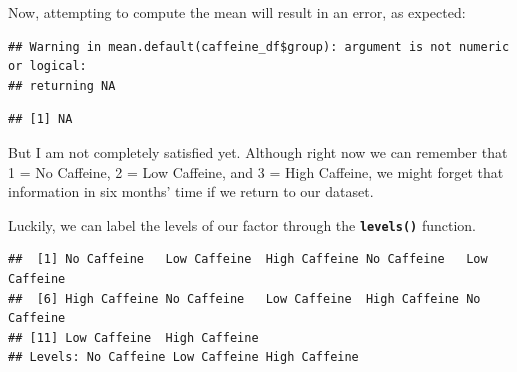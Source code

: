 \documentclass[
]{book}
\newenvironment{Shaded}{\begin{snugshade}}{\end{snugshade}}
\newcommand{\FunctionTok}[1]{\textcolor[rgb]{0.13,0.29,0.53}{\textbf{#1}}}
\newcommand{\NormalTok}[1]{#1}
\newcommand{\OtherTok}[1]{\textcolor[rgb]{0.56,0.35,0.01}{#1}}
\newcommand{\SpecialCharTok}[1]{\textcolor[rgb]{0.81,0.36,0.00}{\textbf{#1}}}
\newcommand{\StringTok}[1]{\textcolor[rgb]{0.31,0.60,0.02}{#1}}
\begin{document}
\begin{Shaded}
\end{Shaded}

Now, attempting to compute the mean will result in an error, as expected:

\begin{Shaded}
\end{Shaded}

\begin{verbatim}
## Warning in mean.default(caffeine_df$group): argument is not numeric or logical:
## returning NA
\end{verbatim}

\begin{verbatim}
## [1] NA
\end{verbatim}

But I am not completely satisfied yet. Although right now we can remember that 1 = No Caffeine, 2 = Low Caffeine, and 3 = High Caffeine, we might forget that information in six months' time if we return to our dataset.

Luckily, we can label the levels of our factor through the \textbf{\texttt{levels()}} function.

\begin{Shaded}
\end{Shaded}

\begin{verbatim}
##  [1] No Caffeine   Low Caffeine  High Caffeine No Caffeine   Low Caffeine 
##  [6] High Caffeine No Caffeine   Low Caffeine  High Caffeine No Caffeine  
## [11] Low Caffeine  High Caffeine
## Levels: No Caffeine Low Caffeine High Caffeine
\end{verbatim}
\end{document}
